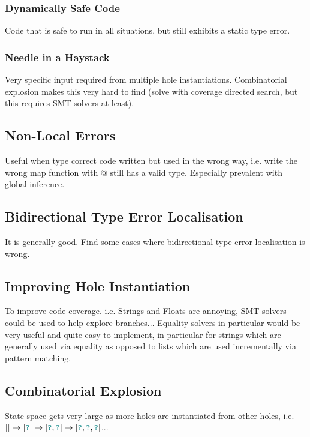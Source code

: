 \subsubsection{Dynamically Safe Code}
Code that is safe to run in all situations, but still exhibits a static type error.

\subsubsection{Needle in a Haystack}
Very specific input required from multiple hole instantiations. Combinatorial explosion makes this very hard to find (solve with coverage directed search, but this requires SMT solvers at least).

\subsection{Non-Local Errors}
Useful when type correct code written but used in the wrong way, i.e. write the wrong map function with @ still has a valid type. Especially prevalent with global inference.
\subsection{Bidirectional Type Error Localisation}
It is generally good. Find some cases where bidirectional type error localisation is wrong.
\subsection{Improving Hole Instantiation}
To improve code coverage. i.e. Strings and Floats are annoying, SMT solvers could be used to help explore branches... Equality solvers in particular would be very useful and quite easy to implement, in particular for strings which are generally used via equality as opposed to lists which are used incrementally via pattern matching.
\subsection{Combinatorial Explosion}
State space gets very large as more holes are instantiated from other holes, i.e. $[] \to [{\color{teal}\texttt{?}}] \to [{\color{teal}\texttt{?}}, {\color{teal}\texttt{?}}] \to [{\color{teal}\texttt{?}},{\color{teal}\texttt{?}},{\color{teal}\texttt{?}}]$...
